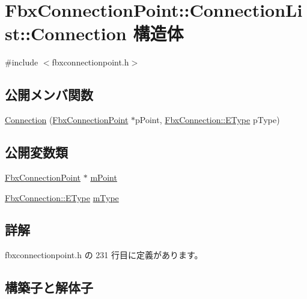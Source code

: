 \hypertarget{struct_fbx_connection_point_1_1_connection_list_1_1_connection}{}\section{Fbx\+Connection\+Point\+:\+:Connection\+List\+:\+:Connection 構造体}
\label{struct_fbx_connection_point_1_1_connection_list_1_1_connection}


{\ttfamily \#include $<$fbxconnectionpoint.\+h$>$}

\subsection*{公開メンバ関数}
\begin{DoxyCompactItemize}
\item 
\hyperlink{struct_fbx_connection_point_1_1_connection_list_1_1_connection_a1c29fc410e48b4e3d51d918b04c03dd9}{Connection} (\hyperlink{class_fbx_connection_point}{Fbx\+Connection\+Point} $\ast$p\+Point, \hyperlink{class_fbx_connection_a3df448a5db356652ab99fd2be2553749}{Fbx\+Connection\+::\+E\+Type} p\+Type)
\end{DoxyCompactItemize}
\subsection*{公開変数類}
\begin{DoxyCompactItemize}
\item 
\hyperlink{class_fbx_connection_point}{Fbx\+Connection\+Point} $\ast$ \hyperlink{struct_fbx_connection_point_1_1_connection_list_1_1_connection_afcd68ab69315b9c919b4a2104d28eeaa}{m\+Point}
\item 
\hyperlink{class_fbx_connection_a3df448a5db356652ab99fd2be2553749}{Fbx\+Connection\+::\+E\+Type} \hyperlink{struct_fbx_connection_point_1_1_connection_list_1_1_connection_ad3018de581c15cd5cf4e85c2a87b9d6b}{m\+Type}
\end{DoxyCompactItemize}


\subsection{詳解}


 fbxconnectionpoint.\+h の 231 行目に定義があります。



\subsection{構築子と解体子}
\mbox{\label{struct_fbx_connection_point_1_1_connection_list_1_1_connection_a1c29fc410e48b4e3d51d918b04c03dd9}} 
